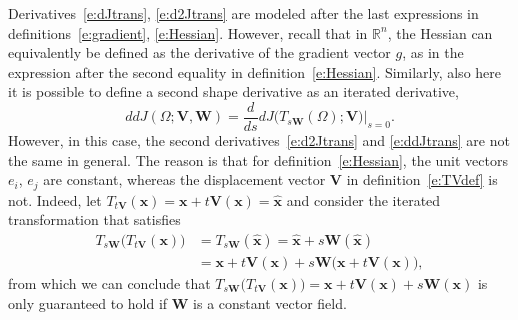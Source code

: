 \documentclass{article}
\theoremstyle{remark}
\numberwithin{equation}{section}
\newcommand{\RR}{\mathbb{R}}
\let\bs\boldsymbol
\begin{document}
Derivatives~\eqref{e:dJtrans}, \eqref{e:d2Jtrans} are modeled after the last expressions in definitions~\eqref{e:gradient}, \eqref{e:Hessian}.
However, recall that in $\RR^n$, the Hessian can equivalently be defined as the derivative of the gradient vector $g$, as in the expression after the second equality in definition~\eqref{e:Hessian}.
Similarly, also here it is possible to define a second shape derivative as an iterated derivative,
%
\begin{equation}\label{e:ddJtrans}
dd J(\Omega; \bs V, \bs W) = \frac d{ds} dJ\bigl(T_{s\bs W}(\Omega);\bs V\bigr)\big|_{s=0}.
\end{equation}
%
However, in this case, the second derivatives~\eqref{e:d2Jtrans} and \eqref{e:ddJtrans} are not the same in general.
The reason is that for definition~\eqref{e:Hessian}, the unit vectors $e_i$, $e_j$ are constant, whereas the displacement vector $\bs V$ in definition~\eqref{e:TVdef} is not.
Indeed, let $T_{t\bs V}(\bs x) = \bs x + t\bs V(\bs x) = \hat{\bs x}$ and consider the iterated transformation that satisfies
%
\begin{equation}\label{e:TsWTtV}
\begin{aligned}
T_{s\bs W}\bigl(T_{t\bs V}(\bs x)\bigr) &= T_{s\bs W}(\hat{\bs x}) 
=\hat{\bs x} + s\bs W(\hat{\bs x}) 
\\
&= \bs x + t\bs V(\bs x) + s\bs W\bigl(\bs x + t\bs V(\bs x)\bigr), 
\end{aligned}
\end{equation}
%
from which we can conclude that $T_{s\bs W}\bigl(T_{t\bs V}(\bs x)\bigr) = \bs x + t\bs V(\bs x) + s\bs W(\bs x)$ is only guaranteed to hold if $\bs W$ is a constant vector field.  
\end{document}
